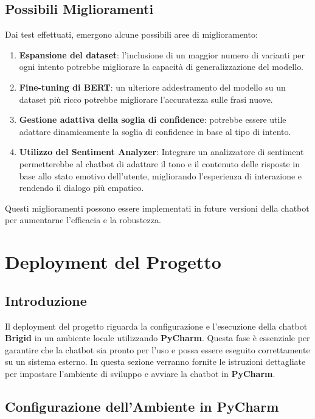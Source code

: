 \documentclass[12pt, letterpaper]{article}
\begin{document}
\subsection{Possibili Miglioramenti}

Dai test effettuati, emergono alcune possibili aree di miglioramento:
\begin{enumerate}
	\item \textbf{Espansione del dataset}: l’inclusione di un maggior numero di varianti per ogni intento potrebbe migliorare la capacità di generalizzazione del modello.
	\item \textbf{Fine-tuning di BERT}: un ulteriore addestramento del modello su un dataset più ricco potrebbe migliorare l’accuratezza sulle frasi nuove.
	\item \textbf{Gestione adattiva della soglia di confidence}: potrebbe essere utile adattare dinamicamente la soglia di confidence in base al tipo di intento.
	\item \textbf{Utilizzo del Sentiment Analyzer}: Integrare un analizzatore di sentiment permetterebbe al chatbot di adattare il tono e il contenuto delle risposte in base allo stato emotivo dell’utente, migliorando l’esperienza di interazione e rendendo il dialogo più empatico.
\end{enumerate}
Questi miglioramenti possono essere implementati in future versioni della chatbot per aumentarne l’efficacia e la robustezza.

\section{Deployment del Progetto}

\subsection{Introduzione}
Il deployment del progetto riguarda la configurazione e l'esecuzione della chatbot \textbf{Brigid} in un ambiente locale utilizzando \textbf{PyCharm}. Questa fase è essenziale per garantire che la chatbot sia pronto per l'uso e possa essere eseguito correttamente su un sistema esterno.
In questa sezione verranno fornite le istruzioni dettagliate per impostare l'ambiente di sviluppo e avviare la chatbot in \textbf{PyCharm}.

\subsection{Configurazione dell'Ambiente in PyCharm}
\end{document}

